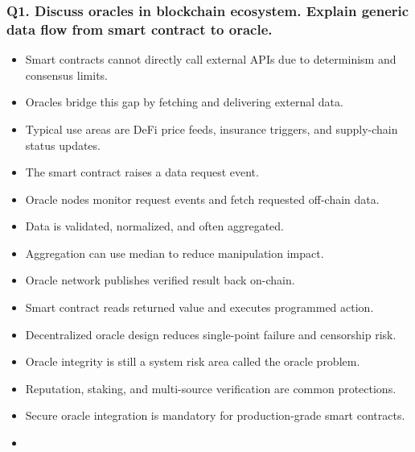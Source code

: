 \documentclass[12pt,a4paper]{article}
\begin{document}
\subsubsection*{Q1. Discuss oracles in blockchain ecosystem. Explain generic data flow from smart contract to oracle.}
\begin{itemize}
\item Smart contracts cannot directly call external APIs due to determinism and consensus limits.
\item Oracles bridge this gap by fetching and delivering external data.
\item Typical use areas are DeFi price feeds, insurance triggers, and supply-chain status updates.
\item The smart contract raises a data request event.
\item Oracle nodes monitor request events and fetch requested off-chain data.
\item Data is validated, normalized, and often aggregated.
\item Aggregation can use median to reduce manipulation impact.
\item Oracle network publishes verified result back on-chain.
\item Smart contract reads returned value and executes programmed action.
\item Decentralized oracle design reduces single-point failure and censorship risk.
\item Oracle integrity is still a system risk area called the oracle problem.
\item Reputation, staking, and multi-source verification are common protections.
\item Secure oracle integration is mandatory for production-grade smart contracts.
\item[]
\vspace{0.25em}
\noindent{}
\end{itemize}
\end{document}
